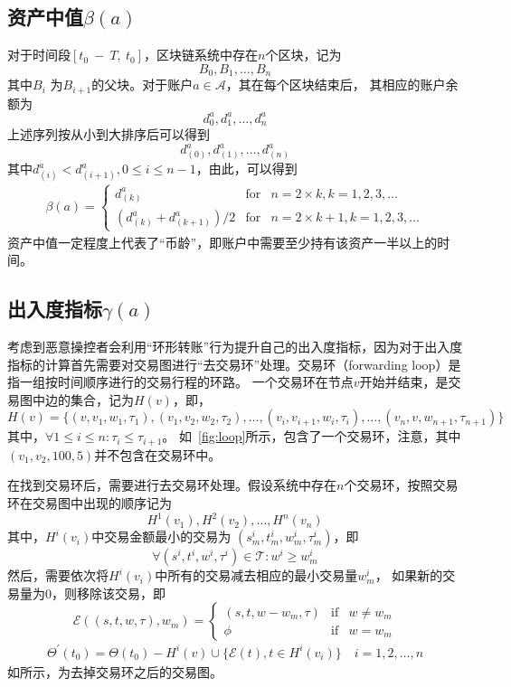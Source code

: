 \subsection{资产中值$\beta(a)$}
对于时间段$[t_0\ −\ T,\ t_0]$，区块链系统中存在$n$个区块，记为
\[
B_0, B_1, \dots, B_n
\]
\noindent 其中$B_{i}$ 为$B_{i+1}$的父块。对于账户$a \in \mathcal{A}$，其在每个区块结束后，
其相应的账户余额为
\[
d^a_0, d^a_1, \dots, d^a_n
\]
上述序列按从小到大排序后可以得到
\[
d^a_{(0)}, d^a_{(1)}, \dots, d^a_{(n)}
\]
其中$d^a_{(i)} < d^a_{(i+1)}, 0\le i \le {n-1}$，由此，可以得到
\begin{align}
\beta(a) = \left\{ \begin{array}{rcl}
{d^a_{(k)}} & \mbox{for} & n=2\times{}k, k=1, 2, 3, \ldots \\
{(d^a_{(k)} + d^a_{(k+1)})/2} & \mbox{for} & n=2\times{}k + 1, k=1, 2, 3, \ldots
\end{array}\right.
\end{align}
资产中值一定程度上代表了“币龄”，即账户中需要至少持有该资产一半以上的时间。

\subsection{出入度指标$\gamma(a)$}
考虑到恶意操控者会利用“环形转账”行为提升自己的出入度指标，因为对于出入度指标的计算首先需要对交易图进行“去交易环”处理。交易环（forwarding loop）是指一组按时间顺序进行的交易行程的环路。
一个交易环在节点$v$开始并结束，是交易图中边的集合，记为$H(v)$，即，
\[
H(v) = \{(v, v_1, w_1, \tau_1), (v_1, v_2, w_2, \tau_2), \dots, (v_i, v_{i+1}, w_{i}, \tau_i), \dots, (v_n, v, w_{n+1}, \tau_{n+1})\}
\]
\noindent 其中，$\forall 1\le i \le n : \tau_i \le \tau_{i+1} $。
\noindent 如~\ref{fig:loop}所示，包含了一个交易环，注意，其中$(v_1, v_2, 100, 5)$并不包含在交易环中。




在找到交易环后，需要进行去交易环处理。假设系统中存在$n$个交易环，按照交易环在交易图中出现的顺序记为
\[
H^1(v_1), H^2(v_2), \dots, H^n(v_n)\]
\noindent 其中，$H^i(v_i)$中交易金额最小的交易为 $(s^i_m, t^i_m, w^i_m, \tau^i_m)$，即
\[
\forall (s^i, t^i, w^i, \tau^i) \in \mathcal{T} : w^i \ge w^i_m
\]
\noindent 然后，需要依次将$H^i(v_i)$中所有的交易减去相应的最小交易量$w^i_m$，
如果新的交易量为0，则移除该交易，即
\[
\mathcal{E}((s, t, w, \tau), w_m) = \left\{ \begin{array}{rcl}
(s, t, w-w_m, \tau) & \mbox{if} & w \ne w_m \\
\phi & \mbox{if} & w = w_m
\end{array}\right.
\]
\begin{align}
\Theta^{\prime}(t_0)=\Theta(t_0)-H^i(v) \cup \{\mathcal{E}(t), t\in H^i(v_i)\} \quad i = 1, 2,\dots, n
\end{align}
\noindent 如所示，为去掉交易环之后的交易图。


